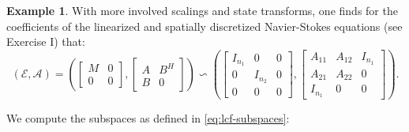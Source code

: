 \documentclass[]{book}
\theoremstyle{definition}
\theoremstyle{definition}
\newtheorem{example}{Example}[chapter]
\theoremstyle{definition}
\theoremstyle{remark}
\begin{document}
\begin{example}
\protect\hypertarget{exm:strangeness-in-the-nse}{}{\label{exm:strangeness-in-the-nse} }With more involved scalings and state transforms, one finds for the coefficients of the linearized and spatially discretized Navier-Stokes equations (see Exercise I) that:
\[
(\mathcal E, \mathcal A) =
\left(
\begin{bmatrix} M & 0 \\ 0 & 0 \end{bmatrix}
,
\begin{bmatrix} A & B^H \\ B & 0 \end{bmatrix}
\right)
\backsim 
\left(
\begin{bmatrix} I_{n_1} & 0 & 0 \\ 0 & I_{n_2} & 0 \\ 0 & 0 & 0\end{bmatrix}
,
\begin{bmatrix} A_{11} & A_{12} & I_{n_1} \\ A_{21} & A_{22} & 0 \\ I_{n_1} & 0 & 0\end{bmatrix}
\right).
\]

We compute the subspaces as defined in \eqref{eq:lcf-subspaces}:


\end{example}
\end{document}
